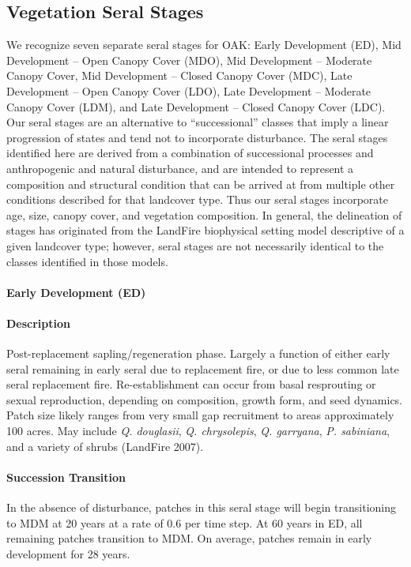 \subsection*{Vegetation Seral Stages}
We recognize seven separate seral stages for OAK: Early Development (ED), Mid Development – Open Canopy Cover (MDO), Mid Development – Moderate Canopy Cover, Mid Development – Closed Canopy Cover (MDC), Late Development – Open Canopy Cover (LDO), Late Development – Moderate Canopy Cover (LDM), and Late Development – Closed Canopy Cover (LDC). Our seral stages are an alternative to ``successional'' classes that imply a linear progression of states and tend not to incorporate disturbance. The seral stages identified here are derived from a combination of successional processes and anthropogenic and natural disturbance, and are intended to represent a composition and structural condition that can be arrived at from multiple other conditions described for that landcover type. Thus our seral stages incorporate age, size, canopy cover, and vegetation composition. In general, the delineation of stages has originated from the LandFire biophysical setting model descriptive of a given landcover type; however, seral stages are not necessarily identical to the classes identified in those models.

\paragraph{Early Development (ED)}

\paragraph{Description} Post-replacement sapling/regeneration phase. Largely a function of either early seral remaining in early seral due to replacement fire, or due to less common late seral replacement fire. Re-establishment can occur from basal resprouting or sexual reproduction, depending on composition, growth form, and seed dynamics. Patch size likely ranges from very small gap recruitment to areas approximately 100 acres. May include \emph{Q. douglasii}, \emph{Q. chrysolepis}, \emph{Q. garryana}, \emph{P. sabiniana}, and a variety of shrubs (LandFire 2007).


\paragraph{Succession Transition} In the absence of disturbance, patches in this seral stage will begin transitioning to MDM at 20 years at a rate of 0.6 per time step. At 60 years in ED, all remaining patches transition to MDM. On average, patches remain in early development for 28 years.

